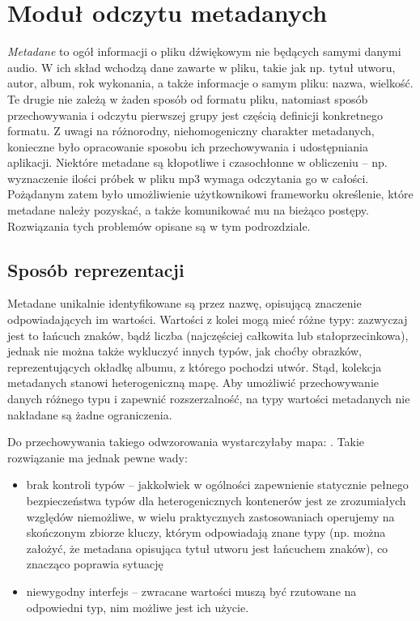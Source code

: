 \chapter{Moduł odczytu metadanych}
\label{sec:metadane}

\emph{Metadane} to ogół informacji o pliku dźwiękowym nie będących samymi danymi audio. W ich skład
wchodzą dane zawarte w pliku, takie jak np. tytuł utworu, autor, album, rok wykonania, a także
informacje o samym pliku: nazwa, wielkość. Te drugie nie zależą w żaden sposób od formatu pliku,
natomiast sposób przechowywania i odczytu pierwszej grupy jest częścią definicji konkretnego
formatu. Z uwagi na różnorodny, niehomogeniczny charakter metadanych, konieczne było opracowanie
sposobu ich przechowywania i udostępniania aplikacji. Niektóre metadane są kłopotliwe i czasochłonne
w obliczeniu -- np. wyznaczenie ilości próbek w pliku mp3 wymaga odczytania go w całości. Pożądanym
zatem było umożliwienie użytkownikowi frameworku określenie, które metadane należy pozyskać, a także
komunikować mu na bieżąco postępy. Rozwiązania tych problemów opisane są w tym podrozdziale.

\section{Sposób reprezentacji}

Metadane unikalnie identyfikowane są przez nazwę, opisującą znaczenie odpowiadających im wartości.
Wartości z kolei mogą mieć różne typy: zazwyczaj jest to łańcuch znaków, bądź liczba (najczęściej
całkowita lub stałoprzecinkowa), jednak nie można także wykluczyć innych typów, jak choćby obrazków,
reprezentujących okładkę albumu, z którego pochodzi utwór. Stąd, kolekcja metadanych stanowi
heterogeniczną mapę. Aby umożliwić przechowywanie danych różnego typu i zapewnić rozszerzalność, na
typy wartości metadanych nie nakładane są żadne ograniczenia.

Do przechowywania takiego odwzorowania wystarczyłaby mapa: . Takie
rozwiązanie ma jednak pewne wady:

\begin{itemize}

  \item brak kontroli typów -- jakkolwiek w ogólności zapewnienie statycznie pełnego bezpieczeństwa
    typów dla heterogenicznych kontenerów jest ze zrozumiałych względów niemożliwe, w wielu
    praktycznych zastosowaniach operujemy na skończonym zbiorze kluczy, którym odpowiadają znane
    typy (np. można założyć, że metadana opisująca tytuł utworu jest łańcuchem znaków), co znacząco
    poprawia sytuację

  \item niewygodny interfejs -- zwracane wartości muszą być rzutowane na odpowiedni typ, nim możliwe
    jest ich użycie.

\end{itemize}

